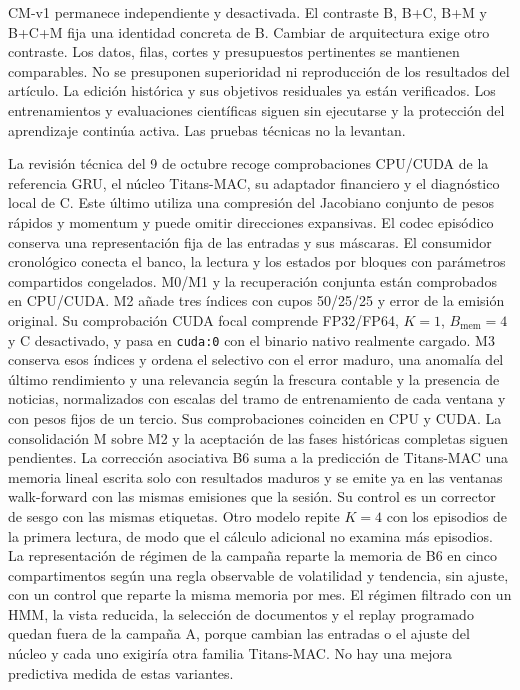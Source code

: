 \documentclass[11pt,a4paper]{report}
\begin{document}
CM-v1 permanece independiente y desactivada. El contraste B, B+C, B+M y B+C+M
fija una identidad concreta de B. Cambiar de arquitectura exige otro contraste.
Los datos, filas, cortes y presupuestos pertinentes se mantienen comparables.
No se presuponen superioridad ni reproducción de los resultados del artículo.
La edición histórica y sus objetivos residuales ya están verificados. Los
entrenamientos y evaluaciones científicas siguen sin ejecutarse y la protección
del aprendizaje continúa activa. Las pruebas técnicas no la levantan.

La revisión técnica del 9 de octubre recoge comprobaciones CPU/CUDA de la referencia GRU,
el núcleo Titans-MAC, su adaptador financiero y el diagnóstico local de C.
Este último utiliza una compresión del Jacobiano conjunto de pesos rápidos
y momentum y puede omitir direcciones expansivas. El codec episódico conserva
una representación fija de las entradas y sus máscaras. El consumidor
cronológico conecta el banco, la lectura y los estados por bloques con
parámetros compartidos congelados. M0/M1 y la recuperación conjunta están
comprobados en CPU/CUDA. M2 añade tres índices con cupos 50/25/25 y error de la
emisión original. Su comprobación CUDA focal comprende FP32/FP64, $K=1$,
$B_{\mathrm{mem}}=4$ y C desactivado, y pasa en \texttt{cuda:0} con el binario
nativo realmente cargado. M3 conserva esos índices y ordena el selectivo con
el error maduro, una anomalía del último rendimiento y una relevancia según la
frescura contable y la presencia de noticias, normalizados con escalas del
tramo de entrenamiento de cada ventana y con pesos fijos de un tercio. Sus
comprobaciones coinciden en CPU y CUDA. La consolidación M sobre M2 y la
aceptación de las fases históricas completas siguen pendientes. La corrección
asociativa B6 suma a la predicción de Titans-MAC una memoria lineal escrita
solo con resultados maduros y se emite ya en las ventanas walk-forward con las
mismas emisiones que la sesión. Su control es un corrector de sesgo con las
mismas etiquetas. Otro modelo repite $K=4$ con los episodios de la primera
lectura, de modo que el cálculo adicional no examina más episodios. La
representación de régimen de la campaña reparte la memoria de B6 en cinco
compartimentos según una regla observable de volatilidad y tendencia, sin
ajuste, con un control que reparte la misma memoria por mes. El régimen
filtrado con un HMM, la vista reducida, la selección de documentos y el replay
programado quedan fuera de la campaña A, porque cambian las entradas o el ajuste del
núcleo y cada uno exigiría otra familia Titans-MAC. No hay una mejora
predictiva medida de estas variantes.
\end{document}

